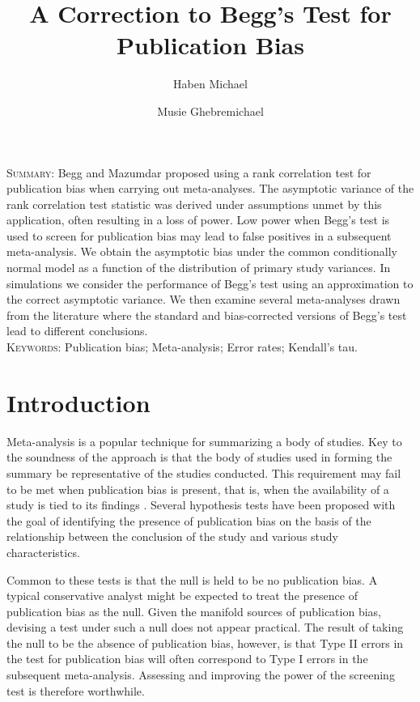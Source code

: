 \documentclass[12pt]{article}
\title{A Correction to Begg's Test for Publication Bias}
\author[1]{Haben Michael}
\author[2]{Musie Ghebremichael}
\affil[1]{University of Massachusetts, Amherst, MA (hmichael@math.umass.edu)}
\affil[2]{Ragon Institute and Harvard University, Cambridge, MA (musie\_ghebremichael@dfci.harvard.edu)}
\date{}
\begin{document}
\maketitle

\noindent \textsc{Summary}: Begg and Mazumdar proposed using a rank correlation test 
for publication bias when carrying out meta-analyses. The asymptotic
variance of the rank correlation test statistic was derived under
assumptions unmet by this application, often resulting in a loss of
power. Low power when Begg's test is used to screen for publication
bias may lead to false positives in a subsequent meta-analysis. We
obtain the asymptotic bias under the common conditionally normal model
as a function of the distribution of primary study variances. In
simulations we consider the performance of Begg's test using an
approximation to the correct asymptotic variance. We then examine
several meta-analyses drawn from the literature where the standard and
bias-corrected versions of Begg's test lead to different conclusions.\\
\textsc{Keywords}: Publication bias; Meta-analysis; Error rates; Kendall's tau.

\section{Introduction}

  Meta-analysis is a popular technique for summarizing a body of
  studies. Key to the soundness of the approach is that the body of
  studies used in forming the summary be representative of the studies conducted. This
  requirement may fail to be met when publication bias is present, that is,
  when the availability of a study is tied to its findings \citep{begg1994b}. Several
  hypothesis tests have been proposed with the goal of identifying the
  presence of publication bias on the basis of the relationship
  between the conclusion of the study and various study
  characteristics.
  
  Common to these tests is that the null is held to be no publication
  bias. A typical conservative analyst might be expected to treat the
  presence of publication bias as the null. Given the manifold sources
  of publication bias, devising a test under such a null does not
  appear practical. The result of taking the null to be the absence of
  publication bias, however, is that Type II errors in the test for
  publication bias will often correspond to Type I errors in the
  subsequent meta-analysis. Assessing and improving the power of the
  screening test is therefore worthwhile.
\end{document}

